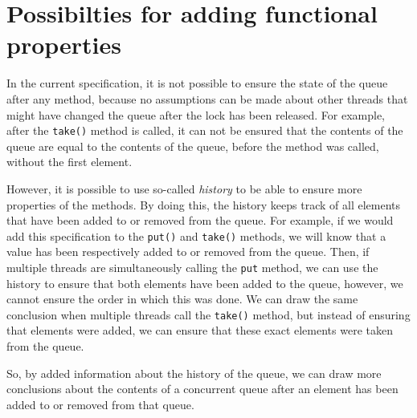 \section{Possibilties for adding functional properties}
In the current specification, it is not possible to ensure the state of the queue after any method, because no assumptions can be made about other threads that might have changed the queue after the lock has been released. For example, after the {\tt take()} method is called, it can not be ensured that the contents of the queue are equal to the contents of the queue, before the method was called, without the first element.

However, it is possible to use so-called {\it history} to be able to ensure more properties of the methods. By doing this, the history keeps track of all elements that have been added to or removed from the queue. For example, if we would add this specification to the {\tt put()} and {\tt take()} methods, we will know that a value has been respectively added to or removed from the queue. Then, if multiple threads are simultaneously calling the {\tt put} method, we can use the history to ensure that both elements have been added to the queue, however, we cannot ensure the order in which this was done. We can draw the same conclusion when multiple threads call the {\tt take()} method, but instead of ensuring that elements were added, we can ensure that these exact elements were taken from the queue.

So, by added information about the history of the queue, we can draw more conclusions about the contents of a concurrent queue after an element has been added to or removed from that queue.
